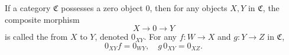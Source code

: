 If a category $\mathfrak{C}$ possesses a zero object $0$, then for any objects $X, Y$ in $\mathfrak{C}$, the composite morphism
$$X \to 0 \to Y$$
is called the  from $X$ to $Y$, denoted $0_{XY}$. For any $f: W \to X$ and $g: Y \to Z$ in $\mathfrak{C}$,
$$0_{XY} f = 0_{WY}, \quad g\,0_{XY} = 0_{XZ}.$$
